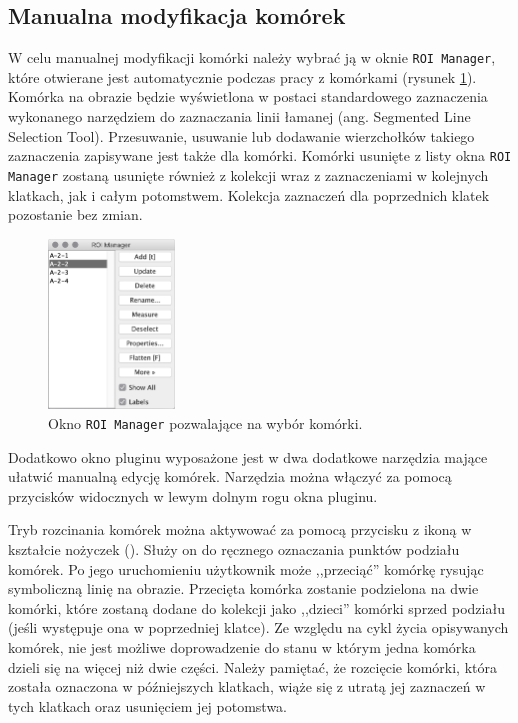 \documentclass[declaration,shortabstract,mgr]{iithesis}
\begin{document}
\subsection{Manualna modyfikacja komórek}
\label{sec:user-manual-modifications}

W celu manualnej modyfikacji komórki należy wybrać ją w oknie \texttt{ROI Manager}, które otwierane jest automatycznie podczas pracy z komórkami (rysunek \ref{fig:ui-roi-manager}).
Komórka na obrazie będzie wyświetlona w postaci standardowego zaznaczenia wykonanego narzędziem do zaznaczania linii łamanej (ang. Segmented Line Selection Tool)\cite{imagej:segmented-line}.
Przesuwanie, usuwanie lub dodawanie wierzchołków takiego zaznaczenia zapisywane jest także dla komórki.
Komórki usunięte z listy okna \texttt{ROI Manager} zostaną usunięte również z kolekcji wraz z zaznaczeniami w kolejnych klatkach, jak i całym potomstwem.
Kolekcja zaznaczeń dla poprzednich klatek pozostanie bez zmian.

\begin{figure}
  \centering
  \includegraphics[width=0.3\textwidth]{images/ui-roi-manager.png}
  \caption{Okno \texttt{ROI Manager} pozwalające na wybór komórki.}
  \label{fig:ui-roi-manager}
\end{figure}

Dodatkowo okno pluginu wyposażone jest w dwa dodatkowe narzędzia mające ułatwić manualną edycję komórek. Narzędzia można włączyć za pomocą przycisków widocznych w lewym dolnym rogu okna pluginu.

Tryb rozcinania komórek można aktywować za pomocą przycisku z ikoną w kształcie nożyczek ().
Służy on do ręcznego oznaczania punktów podziału komórek. Po jego uruchomieniu użytkownik może ,,przeciąć'' komórkę rysując symboliczną linię na obrazie.
Przecięta komórka zostanie podzielona na dwie komórki, które zostaną dodane do kolekcji jako ,,dzieci'' komórki sprzed podziału (jeśli występuje ona w poprzedniej klatce).
Ze względu na cykl życia opisywanych komórek, nie jest możliwe doprowadzenie do stanu w którym jedna komórka dzieli się na więcej niż dwie części.
Należy pamiętać, że rozcięcie komórki, która została oznaczona w późniejszych klatkach, wiąże się z utratą jej zaznaczeń w tych klatkach oraz usunięciem jej potomstwa.
\end{document}
